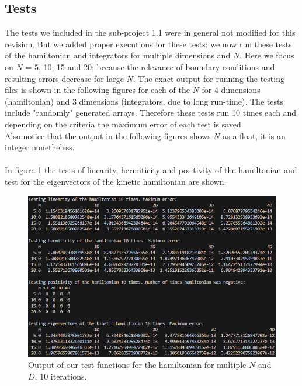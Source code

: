 \documentclass[11pt, letterpaper, onecolumn]{article}
\begin{document}
	\subsection{Tests}
	The tests we included in the sub-project 1.1 were in general not modified for this revision. But we added proper executions for these tests: we now run these tests of the hamiltonian and integrators for multiple dimensions and $N$. Here we focus on $N$ = 5, 10, 15 and 20; because the relevance of boundary conditions and resulting errors decrease for large $N$. The exact output for running the testing files is shown in the following figures for each of the $N$ for 4 dimensions (hamiltonian) and 3 dimensions (integrators, due to long run-time). The tests include "randomly" generated arrays. Therefore these tests run 10 times each and depending on the criteria the maximum error of each test is saved.\\
	Also notice that the output in the following figures shows $N$ as a float, it is an integer nonetheless.
	\\
	\\
        \newpage
        \noindent
	In figure \ref{fig:test-hamiltonian} the tests of linearity, hermiticity and positivity of the hamiltonian and test      for the eigenvectors of the kinetic hamiltonian are shown.
	\begin{figure} [H] 
	\begin{center}
	\includegraphics[width=15cm]{"test_hamiltonian2.png"}
	\caption{Output of our test functions for the hamiltonian for multiple $N$ and $D$; 10 iterations.} 	\label{fig:test-hamiltonian}
	\end{center}	
	\end{figure}
	\\
\end{document}
